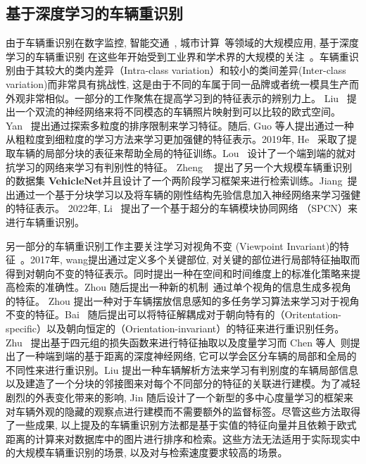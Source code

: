 \subsection{基于深度学习的车辆重识别}
由于车辆重识别在数字监控, 智能交通~\cite{zhang2011data}, 城市计算~\cite{zheng2014urban}等领域的大规模应用, 基于深度学习的车辆重识别\cite{liu2016large, liu2016deep, wang2017orientation} \cite{liu2017provid, bai2020disentangled, meng2020parsing}在这些年开始受到工业界和学术界的大规模的关注~。车辆重识别由于其较大的类内差异（Intra-class variation）和较小的类间差异(Inter-class variation)而非常具有挑战性, 这是由于不同的车属于同一品牌或者统一模具生产而外观非常相似。一部分的工作聚焦在提高学习到的特征表示的辨别力上。 Liu~\cite{liu2017beyond} 提出一个双流的神经网络来将不同模态的车辆照片映射到可以比较的欧式空间。Yan~\cite{yan2017exploiting} 提出通过探索多粒度的排序限制来学习特征。随后, Guo 等人提出通过一种从粗粒度到细粒度的学习方法来学习更加强健的特征表示。2019年, He~\cite{he2019part} 采取了提取车辆的局部分块的表征来帮助全局的特征训练。Lou ~\cite{lou2019embedding}设计了一个端到端的就对抗学习的网络来学习有判别性的特征。
Zheng ~\cite{zheng2020vehiclenet} 提出了另一个大规模车辆重识别的数据集 \textbf{VehicleNet}并且设计了一个两阶段学习框架来进行检索训练。Jiang~\cite{jiang2021robust}提出通过一个基于分块学习以及将车辆的刚性结构先验信息加入神经网络来学习强健的特征表示。 2022年, Li~\cite{li2022super} 提出了一个基于超分的车辆模块协同网络 （SPCN）来进行车辆重识别。 \par
另一部分的车辆重识别工作主要关注学习对视角不变 (Viewpoint Invariant)的特征~\cite{wang2017orientation, zhou2018aware, tang2019pamtri, bai2020disentangled}。2017年, wang提出通过定义多个关键部位, 对关键的部位进行局部特征抽取而得到对朝向不变的特征表示。同时提出一种在空间和时间维度上的标准化策略来提高检索的准确性。Zhou 随后提出一种新的机制~\cite{zhou2018aware}通过单个视角的信息生成多视角的特征。 Zhou 提出一种对于车辆摆放信息感知的多任务学习算法来学习对于视角不变的特征。Bai ~\cite{bai2020disentangled}随后提出可以将特征解耦成对于朝向特有的（Oritentation-specific）以及朝向恒定的（Orientation-invariant）的特征来进行重识别任务。Zhu ~\cite{zhu2019vehicle}提出基于四元组的损失函数来进行特征抽取以及度量学习而 Chen 等人~\cite{chen2020vehicle}则提出了一种端到端的基于距离的深度神经网络, 它可以学会区分车辆的局部和全局的不同性来进行重识别。Liu 提出一种车辆解析方法来学习有判别度的车辆局部信息以及建造了一个分块的邻接图来对每个不同部分的特征的关联进行建模。为了减轻剧烈的外表变化带来的影响, Jin 随后设计了一个新型的多中心度量学习的框架来对车辆外观的隐藏的观察点进行建模而不需要额外的监督标签。尽管这些方法取得了一些成果, 以上提及的车辆重识别方法都是基于实值的特征向量并且依赖于欧式距离的计算来对数据库中的图片进行排序和检索。这些方法无法适用于实际现实中的大规模车辆重识别的场景, 以及对与检索速度要求较高的场景。

